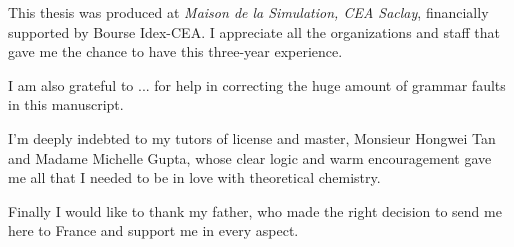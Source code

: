 This thesis was produced at \textit{Maison de la Simulation, CEA Saclay},
financially supported by Bourse Idex-CEA. I appreciate all the
organizations and staff that gave me the chance to have this three-year
experience.

I am also grateful to ... for help in correcting the huge amount of
grammar faults in this manuscript.

I'm deeply indebted to my tutors of license and master, Monsieur Hongwei
Tan and Madame Michelle Gupta, whose clear logic and warm encouragement
gave me all that I needed to be in love with theoretical chemistry.

Finally I would like to thank my father, who made the right decision
to send me here to France and support me in every aspect.

\endgroup
